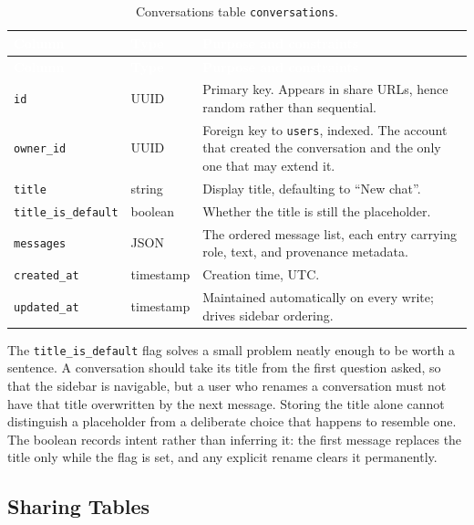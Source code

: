 \begin{longtable}{|p{}|p{}|p{}|}
\caption{Conversations table \texttt{conversations}.}\label{tab:convschema}\\
\hline
\rowcolor{myblue}\textcolor{white}{\textbf{Column}} & \textcolor{white}{\textbf{Type}} & \textcolor{white}{\textbf{Purpose and constraints}} \\
\hline
\endfirsthead
\hline
\rowcolor{myblue}\textcolor{white}{\textbf{Column}} & \textcolor{white}{\textbf{Type}} & \textcolor{white}{\textbf{Purpose and constraints}} \\
\hline
\endhead
\texttt{id} & UUID & Primary key. Appears in share URLs, hence random rather than sequential. \\ \hline
\texttt{owner\_id} & UUID & Foreign key to \texttt{users}, indexed. The account that created the conversation and the only one that may extend it. \\ \hline
\texttt{title} & string & Display title, defaulting to ``New chat''. \\ \hline
\texttt{title\_is\_default} & boolean & Whether the title is still the placeholder. \\ \hline
\texttt{messages} & JSON & The ordered message list, each entry carrying role, text, and provenance metadata. \\ \hline
\texttt{created\_at} & timestamp & Creation time, UTC. \\ \hline
\texttt{updated\_at} & timestamp & Maintained automatically on every write; drives sidebar ordering. \\ \hline
\end{longtable}

The \texttt{title\_is\_default} flag solves a small problem neatly enough to be worth a
sentence. A conversation should take its title from the first question asked, so that the
sidebar is navigable, but a user who renames a conversation must not have that title
overwritten by the next message. Storing the title alone cannot distinguish a placeholder
from a deliberate choice that happens to resemble one. The boolean records intent rather
than inferring it: the first message replaces the title only while the flag is set, and any
explicit rename clears it permanently.

\subsection{Sharing Tables}

